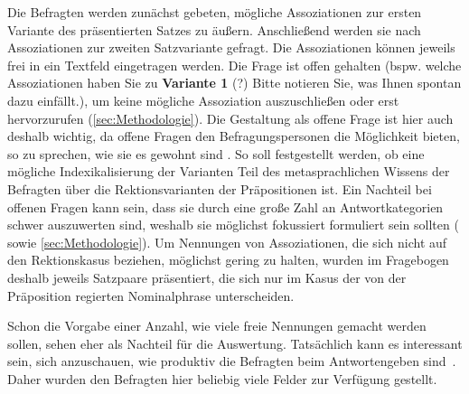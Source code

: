 Die Befragten werden zunächst gebeten, mögliche Assoziationen zur ersten Variante des präsentierten Satzes zu äußern. Anschließend werden sie nach Assoziationen zur zweiten Satzvariante gefragt. Die Assoziationen können jeweils frei in ein Textfeld eingetragen werden. Die Frage ist offen gehalten (bspw. \glqq welche Assoziationen haben Sie zu \textbf{Variante 1} (?) Bitte notieren Sie, was Ihnen spontan dazu einfällt.\grqq), um keine mögliche Assoziation auszuschließen oder erst hervorzurufen (\autoref{sec:Methodologie}). Die Gestaltung als offene Frage ist hier auch deshalb wichtig, da offene Fragen \glqq den Befragungspersonen die Möglichkeit bieten, so zu sprechen, wie sie es gewohnt sind\grqq{} \citep[s.][739]{PorstSept.1996}. So soll festgestellt werden, ob eine mögliche Indexikalisierung der Varianten Teil des metasprachlichen Wissens der Befragten über die Rektionsvarianten der Präpositionen ist. Ein Nachteil bei offenen Fragen kann sein, dass sie durch eine große Zahl an Antwortkategorien schwer auszuwerten sind, weshalb sie möglichst fokussiert formuliert sein sollten (\citealp[s.][62--63]{Porst2014} sowie \autoref{sec:Methodologie}). Um Nennungen von Assoziationen, die sich nicht auf den Rektionskasus beziehen, möglichst gering zu halten, wurden im Fragebogen deshalb jeweils Satzpaare präsentiert, die sich nur im Kasus der von der Präposition regierten Nominalphrase unterscheiden. 

Schon die Vorgabe einer Anzahl, wie viele freie Nennungen gemacht werden sollen, sehen \citet[216]{Garrett.2004} eher als Nachteil für die Auswertung. 
Tatsächlich kann es interessant sein, sich anzuschauen, wie produktiv die Befragten beim Antwortengeben sind~\citep[s.][71]{Adler.2018}. 
Daher wurden den Befragten hier beliebig viele Felder zur Verfügung gestellt. 

